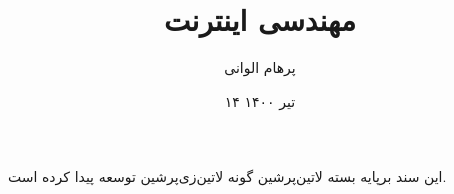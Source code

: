 \documentclass[]{article}
\title{مهندسی اینترنت}
\author{پرهام الوانی}
\date{۱۴ تیر ۱۴۰۰}
\begin{document}
  \maketitle
  \tableofcontents
  \pagebreak

  
  \pagebreak
  
  
  
  
  
  \vspace*{\fill}
  \begin{center}
این سند برپایه بسته ‌لاتین{‌پرشین} گونه ‌لاتین{‌زی‌پرشین} توسعه پیدا کرده است.
  \end{center}
\end{document}
